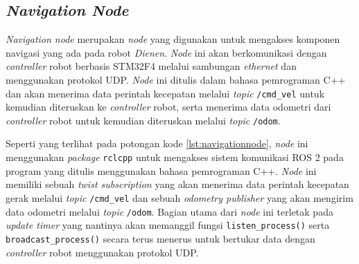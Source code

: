 \subsection{\emph{Navigation Node}}
\label{subsec:navigationnode}

\emph{Navigation node} merupakan \emph{node} yang digunakan untuk mengakses komponen navigasi yang ada pada robot \emph{Dienen}.
\emph{Node} ini akan berkomunikasi dengan \emph{controller} robot berbasis STM32F4 melalui sambungan \emph{ethernet} dan menggunakan protokol UDP.
\emph{Node} ini ditulis dalam bahasa pemrograman C++ dan akan menerima data perintah kecepatan melalui \emph{topic} \lstinline{/cmd_vel} untuk kemudian diteruskan ke \emph{controller} robot,
  serta menerima data odometri dari \emph{controller} robot untuk kemudian diteruskan melalui \emph{topic} \lstinline{/odom}.



Seperti yang terlihat pada potongan kode \ref{lst:navigationnode},
  \emph{node} ini menggunakan \emph{package} \lstinline{rclcpp} untuk mengakses sistem komunikasi ROS 2 pada program yang ditulis menggunakan bahasa pemrograman C++.
\emph{Node} ini memiliki sebuah \emph{twist subscription} yang akan menerima data perintah kecepatan gerak melalui \emph{topic} \lstinline{/cmd_vel} dan sebuah \emph{odometry publisher} yang akan mengirim data odometri melalui \emph{topic} \lstinline{/odom}.
Bagian utama dari \emph{node} ini terletak pada \emph{update timer} yang nantinya akan memanggil fungsi \lstinline{listen_process()} serta \lstinline{broadcast_process()} secara terus menerus untuk bertukar data dengan \emph{controller} robot menggunakan protokol UDP.
